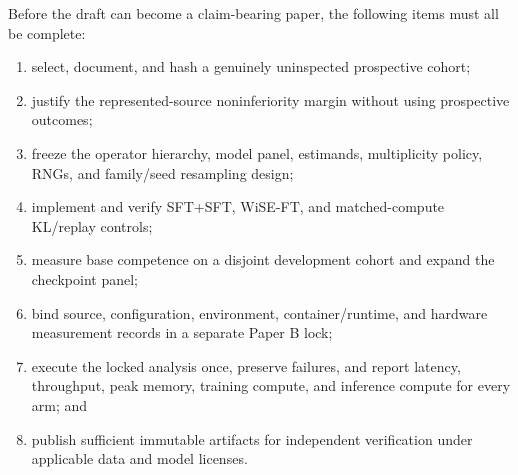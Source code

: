 \documentclass[11pt]{article}
\begin{document}
Before the draft can become a claim-bearing paper, the following items must all be complete:

\begin{enumerate}[leftmargin=1.5em]
  \item select, document, and hash a genuinely uninspected prospective cohort;
  \item justify the represented-source noninferiority margin without using prospective outcomes;
  \item freeze the operator hierarchy, model panel, estimands, multiplicity policy, RNGs, and
        family/seed resampling design;
  \item implement and verify SFT+SFT, WiSE-FT, and matched-compute KL/replay controls;
  \item measure base competence on a disjoint development cohort and expand the checkpoint panel;
  \item bind source, configuration, environment, container/runtime, and hardware measurement
        records in a separate Paper B lock;
  \item execute the locked analysis once, preserve failures, and report latency, throughput, peak
        memory, training compute, and inference compute for every arm; and
  \item publish sufficient immutable artifacts for independent verification under applicable data
        and model licenses.
\end{enumerate}
\end{document}
